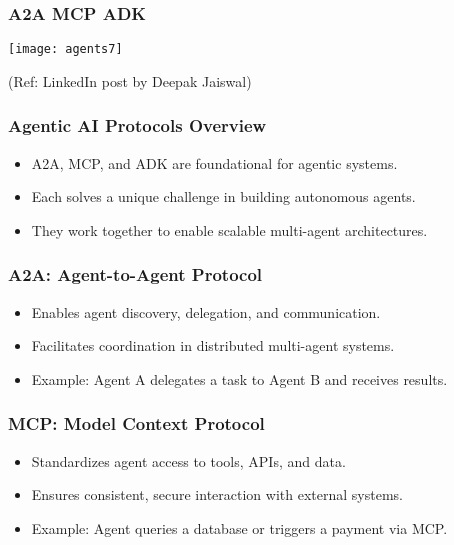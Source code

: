 \begin{frame}[fragile]\frametitle{A2A MCP ADK}
	
	\begin{center}
	\texttt{[image: agents7]}
	\end{center}
	
{\tiny (Ref: LinkedIn post by Deepak Jaiswal)}

\end{frame}

\begin{frame}[fragile]\frametitle{Agentic AI Protocols Overview}
    \begin{itemize}
        \item A2A, MCP, and ADK are foundational for agentic systems.
        \item Each solves a unique challenge in building autonomous agents.
        \item They work together to enable scalable multi-agent architectures.
    \end{itemize}
\end{frame}

\begin{frame}[fragile]\frametitle{A2A: Agent-to-Agent Protocol}
    \begin{itemize}
        \item Enables agent discovery, delegation, and communication.
        \item Facilitates coordination in distributed multi-agent systems.
        \item Example: Agent A delegates a task to Agent B and receives results.
    \end{itemize}
\end{frame}

\begin{frame}[fragile]\frametitle{MCP: Model Context Protocol}
    \begin{itemize}
        \item Standardizes agent access to tools, APIs, and data.
        \item Ensures consistent, secure interaction with external systems.
        \item Example: Agent queries a database or triggers a payment via MCP.
    \end{itemize}
\end{frame}

